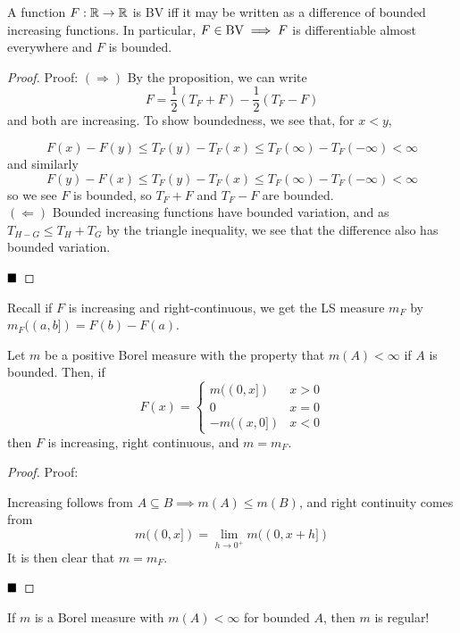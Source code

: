 \begin{theorem}
    A function $F : \R \to \R$ is BV iff it may be written as a difference of bounded increasing functions. In particular, $F \in \tt{BV} \implies F$ is differentiable almost everywhere and $F$ is bounded.
\end{theorem}
\begin{proof}{Proof:}
    $(\Rightarrow)$ By the proposition, we can write
    \[ F = \frac{1}{2}(T_F + F) - \frac{1}{2}(T_F - F) \]
    and both are increasing. To show boundedness, we see that, for $x < y$,

    \[ F(x) - F(y) \leq T_F(y) - T_F(x) \leq T_F(\infty) - T_F(-\infty) < \infty \]
    and similarly
    \[ F(y) - F(x) \leq T_F(y) - T_F(x) \leq T_F(\infty) - T_F(-\infty) < \infty \]
    so we see $F$ is bounded, so $T_F + F$ and $T_F - F$ are bounded.\\


    $(\Leftarrow)$ Bounded increasing functions have bounded variation, and as $T_{H - G} \leq T_{H} + T_{G}$ by the triangle inequality, we see that the difference also has bounded variation.

    $\qed$
\end{proof}

Recall if $F$ is increasing and right-continuous, we get the LS measure $m_F$ by $m_F((a, b]) = F(b) - F(a)$.

\begin{lemma}
    Let $m$ be a positive Borel measure with the property that $m(A) < \infty$ if $A$ is bounded. Then, if
    \[ F(x) = \left\{\begin{matrix} m((0, x]) & x > 0 \\ 0 & x = 0 \\ -m((x, 0]) & x < 0 \end{matrix}\right. \]
    then $F$ is increasing, right continuous, and $m = m_F$.
\end{lemma}
\begin{proof}{Proof:}

    Increasing follows from $A \subseteq B \implies m(A) \leq m(B)$, and right continuity comes from
    \[ m((0, x]) = \lim_{h \to 0^{+}} m((0, x + h]) \]
    It is then clear that $m = m_F$.

    $\qed$
\end{proof}

\begin{lemma}
    If $m$ is a Borel measure with $m(A) < \infty$ for bounded $A$, then $m$ is regular!
\end{lemma}

